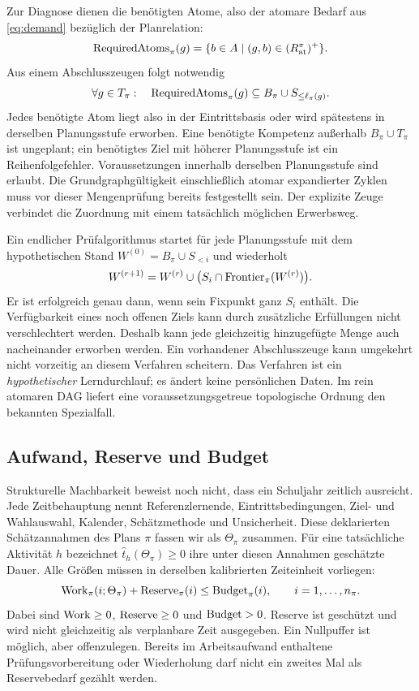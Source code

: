Zur Diagnose dienen die benötigten Atome, also der atomare Bedarf aus
\eqref{eq:demand} bezüglich der Planrelation:
\begin{equation}
 \operatorname{RequiredAtoms}_\pi(g)=\{b\in A\mid(g,b)\in(R_{\mathrm{at}}^{\pi})^+\}.
 \label{eq:reqatoms}
\end{equation}
Aus einem Abschlusszeugen folgt notwendig
\begin{equation}
 \forall g\in T_\pi:\quad
 \operatorname{RequiredAtoms}_\pi(g)\subseteq B_\pi\cup S_{\leq\ell_\pi(g)}.
 \label{eq:level-closure}
\end{equation}
Jedes benötigte Atom liegt also in der Eintrittsbasis oder wird spätestens
in derselben Planungsstufe erworben. Eine benötigte Kompetenz außerhalb
$B_\pi\cup T_\pi$ ist ungeplant;
ein benötigtes Ziel mit höherer Planungsstufe ist ein Reihenfolgefehler.
Voraussetzungen innerhalb derselben Planungsstufe sind erlaubt. Die
Grundgraphgültigkeit einschließlich atomar expandierter Zyklen muss vor
dieser Mengenprüfung bereits festgestellt sein. Der explizite Zeuge
verbindet die Zuordnung mit einem tatsächlich möglichen Erwerbsweg.

Ein endlicher Prüfalgorithmus startet für jede Planungsstufe mit dem
hypothetischen Stand $W^{(0)}=B_\pi\cup S_{<i}$ und wiederholt
\begin{equation}
 W^{(r+1)}=W^{(r)}\cup\bigl(S_i\cap\operatorname{Frontier}_\pi(W^{(r)})\bigr).
\end{equation}
Er ist erfolgreich genau dann, wenn sein Fixpunkt ganz $S_i$ enthält.
Die Verfügbarkeit eines noch offenen Ziels kann durch zusätzliche
Erfüllungen nicht verschlechtert werden. Deshalb kann jede gleichzeitig
hinzugefügte Menge auch nacheinander erworben werden. Ein vorhandener
Abschlusszeuge kann umgekehrt nicht vorzeitig an diesem Verfahren scheitern.
Das Verfahren ist ein \emph{hypothetischer} Lerndurchlauf; es ändert keine
persönlichen Daten. Im rein atomaren DAG liefert eine voraussetzungsgetreue
topologische Ordnung den bekannten Spezialfall.

\subsection{Aufwand, Reserve und Budget}
Strukturelle Machbarkeit beweist noch nicht, dass ein Schuljahr zeitlich
ausreicht. Jede Zeitbehauptung nennt Referenzlernende, Eintrittsbedingungen,
Ziel- und Wahlauswahl, Kalender, Schätzmethode und Unsicherheit.
Diese deklarierten Schätzannahmen des Plans $\pi$ fassen wir als
$\Theta_\pi$ zusammen. Für eine tatsächliche Aktivität $h$ bezeichnet
$\widehat t_h(\Theta_\pi)\geq0$ ihre unter diesen Annahmen geschätzte Dauer.
Alle Größen müssen in derselben kalibrierten Zeiteinheit vorliegen:
\begin{equation}
 \operatorname{Work}_\pi(i;\Theta_\pi)+\operatorname{Reserve}_\pi(i)\leq \operatorname{Budget}_\pi(i),
 \qquad i=1,\ldots,n_\pi.
 \label{eq:budget}
\end{equation}
Dabei sind $\operatorname{Work}\geq0$, $\operatorname{Reserve}\geq0$ und $\operatorname{Budget}>0$.
Reserve ist geschützt und wird nicht gleichzeitig als verplanbare Zeit
ausgegeben. Ein Nullpuffer ist möglich, aber offenzulegen. Bereits im
Arbeitsaufwand enthaltene Prüfungsvorbereitung oder Wiederholung darf nicht
ein zweites Mal als Reservebedarf gezählt werden.

